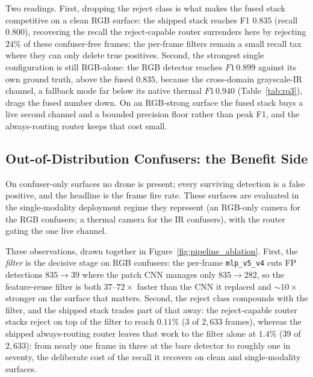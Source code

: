 
Two readings. First, dropping the reject class is what makes the fused stack competitive on a clean RGB surface: the shipped stack reaches F1 $0.835$ (recall $0.800$), recovering the recall the reject-capable router surrenders here by rejecting $24\%$ of these confuser-free frames; the per-frame filters remain a small recall tax where they can only delete true positives. Second, the strongest single configuration is still RGB-alone: the RGB detector reaches $F1\,0.899$ against its own ground truth, above the fused $0.835$, because the cross-domain grayscale-IR channel, a fallback mode far below its native thermal $F1\,0.940$ (Table~\ref{tab:rq3}), drags the fused number down. On an RGB-strong surface the fused stack buys a live second channel and a bounded precision floor rather than peak F1, and the always-routing router keeps that cost small.


\subsection{Out-of-Distribution Confusers: the Benefit Side}
\label{sec:pipeline_confusers}

On confuser-only surfaces no drone is present; every surviving detection is a false positive, and the headline is the frame fire rate. These surfaces are evaluated in the single-modality deployment regime they represent (an RGB-only camera for the RGB confusers; a thermal camera for the IR confusers), with the router gating the one live channel.


Three observations, drawn together in Figure~\ref{fig:pipeline_ablation}. First, the \emph{filter} is the decisive stage on RGB confusers: the per-frame \texttt{mlp\_v5\_v4} cuts FP detections $835 \to 39$ where the patch CNN manages only $835 \to 282$, so the feature-reuse filter is both $37$--$72\times$ faster than the CNN it replaced and ${\sim}10\times$ stronger on the surface that matters. Second, the reject class compounds with the filter, and the shipped stack trades part of that away: the reject-capable router stacks reject on top of the filter to reach $0.11\%$ ($3$ of $2{,}633$ frames), whereas the shipped always-routing router leaves that work to the filter alone at $1.4\%$ ($39$ of $2{,}633$): from nearly one frame in three at the bare detector to roughly one in seventy, the deliberate cost of the recall it recovers on clean and single-modality surfaces.

